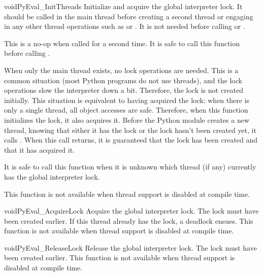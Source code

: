 \documentclass{manual}
\begin{document}
\begin{cfuncdesc}{void}{PyEval_InitThreads}{}
Initialize and acquire the global interpreter lock.  It should be
called in the main thread before creating a second thread or engaging
in any other thread operations such as
 or
.
It is not needed before calling
 or
.

This is a no-op when called for a second time.  It is safe to call
this function before calling
.

When only the main thread exists, no lock operations are needed.  This
is a common situation (most Python programs do not use threads), and
the lock operations slow the interpreter down a bit.  Therefore, the
lock is not created initially.  This situation is equivalent to having
acquired the lock: when there is only a single thread, all object
accesses are safe.  Therefore, when this function initializes the
lock, it also acquires it.  Before the Python
 module creates a new thread,
knowing that either it has the lock or the lock hasn't been created
yet, it calls .  When this call
returns, it is guaranteed that the lock has been created and that it
has acquired it.

It is  safe to call this function when it is unknown which
thread (if any) currently has the global interpreter lock.

This function is not available when thread support is disabled at
compile time.
\end{cfuncdesc}

\begin{cfuncdesc}{void}{PyEval_AcquireLock}{}
Acquire the global interpreter lock.  The lock must have been created
earlier.  If this thread already has the lock, a deadlock ensues.
This function is not available when thread support is disabled at
compile time.
\end{cfuncdesc}

\begin{cfuncdesc}{void}{PyEval_ReleaseLock}{}
Release the global interpreter lock.  The lock must have been created
earlier.  This function is not available when thread support is
disabled at compile time.
\end{cfuncdesc}
\end{document}
